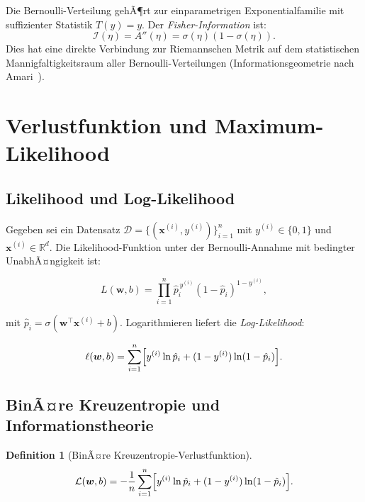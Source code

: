﻿\documentclass[12pt, a4paper]{article}
\theoremstyle{definition}
\newtheorem{definition}[theorem]{Definition}
\theoremstyle{remark}
\newcommand{\R}{\mathbb{R}}
\newcommand{\sigmoid}{\sigma}
\newcommand{\vw}{\bm{w}}
\newcommand{\vx}{\bm{x}}
\newcommand{\T}{\top}
\begin{document}
Die Bernoulli-Verteilung gehÃ¶rt zur einparametrigen Exponentialfamilie mit suffizienter
Statistik $T(y) = y$. Der \emph{Fisher-Information} ist:
\begin{equation}
  \mathcal{I}(\eta) = A''(\eta) = \sigmoid(\eta)(1-\sigmoid(\eta)).
\end{equation}
Dies hat eine direkte Verbindung zur Riemannschen Metrik auf dem statistischen Mannigfaltigkeitsraum
aller Bernoulli-Verteilungen (Informationsgeometrie nach Amari~\citep{amari2016information}).

\section{Verlustfunktion und Maximum-Likelihood}

\subsection{Likelihood und Log-Likelihood}

Gegeben sei ein Datensatz $\mathcal{D} = \{(\vx^{(i)}, y^{(i)})\}_{i=1}^n$ mit
$y^{(i)} \in \{0,1\}$ und $\vx^{(i)} \in \R^d$. Die Likelihood-Funktion unter der
Bernoulli-Annahme mit bedingter UnabhÃ¤ngigkeit ist:

\begin{equation}
  L(\vw, b) = \prod_{i=1}^{n} \hat{p}_i^{\,y^{(i)}} (1-\hat{p}_i)^{1-y^{(i)}},
  \label{eq:likelihood}
\end{equation}

mit $\hat{p}_i = \sigmoid(\vw^\T\vx^{(i)}+b)$. Logarithmieren liefert die \emph{Log-Likelihood}:

\begin{equation}
  \ell(\vw, b) = \sum_{i=1}^{n}\Bigl[ y^{(i)}\ln\hat{p}_i + (1-y^{(i)})\ln(1-\hat{p}_i) \Bigr].
  \label{eq:log_likelihood}
\end{equation}

\subsection{BinÃ¤re Kreuzentropie und Informationstheorie}

\begin{definition}[BinÃ¤re Kreuzentropie-Verlustfunktion]
  \begin{equation}
    \mathcal{L}(\vw, b) = -\frac{1}{n}\sum_{i=1}^{n}\Bigl[ y^{(i)}\ln\hat{p}_i + (1-y^{(i)})\ln(1-\hat{p}_i) \Bigr].
    \label{eq:bce_loss}
  \end{equation}
\end{definition}
\end{document}
